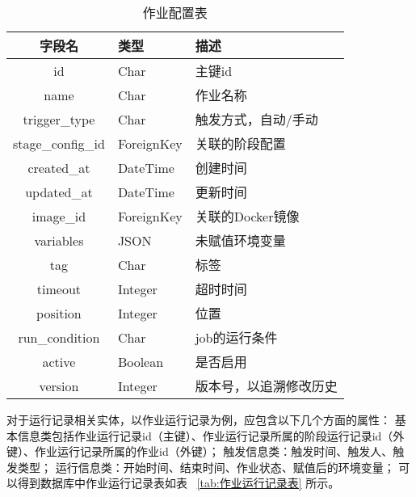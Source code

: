\begin{table}[h]
  \centering
  \caption{作业配置表}
  \label{tab:作业配置表}
  \begin{tabular}{cll}
    \toprule
    字段名                  & 类型            & 描述                                       \\
    \midrule
    id                      & Char           & 主键id                                   \\
    name                    & Char           & 作业名称                                   \\
    trigger\_type           & Char           & 触发方式，自动/手动                        \\
    stage\_config\_id       & ForeignKey     & 关联的阶段配置                             \\
    created\_at             & DateTime       & 创建时间                                    \\
    updated\_at             & DateTime       & 更新时间                                    \\
    image\_id               & ForeignKey     & 关联的Docker镜像                            \\
    variables               & JSON           & 未赋值环境变量                              \\
    tag                     & Char           & 标签                                       \\
    timeout                 & Integer        & 超时时间                                    \\
    position                & Integer        & 位置                                        \\
    run\_condition          & Char           & job的运行条件                               \\
    active                  & Boolean        & 是否启用                                    \\
    version                 & Integer        & 版本号，以追溯修改历史                        \\
    \bottomrule
  \end{tabular}
\end{table}

对于运行记录相关实体，以作业运行记录为例，应包含以下几个方面的属性：
基本信息类包括作业运行记录id（主键）、作业运行记录所属的阶段运行记录id（外键）、作业运行记录所属的作业id（外键）；
触发信息类：触发时间、触发人、触发类型；
运行信息类：开始时间、结束时间、作业状态、赋值后的环境变量；
可以得到数据库中作业运行记录表如表~ \ref{tab:作业运行记录表} 所示。

